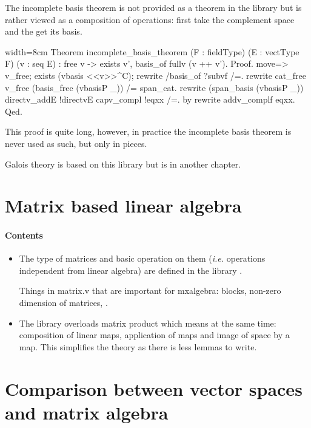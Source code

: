 The incomplete basis theorem is not provided as a theorem in the
library but is rather viewed as a composition of operations: first
take the complement space and the get its basis.

\begin{coq}{}{width=8cm}
Theorem incomplete_basis_theorem (F : fieldType) (E : vectType F) (v : seq E) :
  free v -> exists v', basis_of fullv (v ++ v').
Proof.
move=> v_free; exists (vbasis <<v>>^C); rewrite /basis_of ?subvf /=.
rewrite cat_free v_free (basis_free (vbasisP _)) /= span_cat.
rewrite (span_basis (vbasisP _)) directv_addE !directvE capv_compl !eqxx /=.
by rewrite addv_complf eqxx.
Qed.
\end{coq}

This proof is quite long, however, in practice the incomplete basis
theorem is never used as such, but only in pieces.

Galois theory is based on this library but is in another chapter.

\section{Matrix based linear algebra}
\label{sec:matrix-based-linear}

\paragraph{Contents}

\begin{itemize}
\item The type of matrices and basic operation on them (\textit{i.e.}
  operations independent from linear algebra) are defined in the
  library .

  Things in matrix.v that are important for mxalgebra: blocks,
  non-zero dimension of matrices, .

\item The library  overloads matrix product
  which means at the same time: composition of linear maps,
  application of maps and image of space by a map. This simplifies the
  theory as there is less lemmas to write.

\end{itemize}


\section{Comparison between vector spaces and matrix algebra}
\label{sec:comp-betw-vect}

